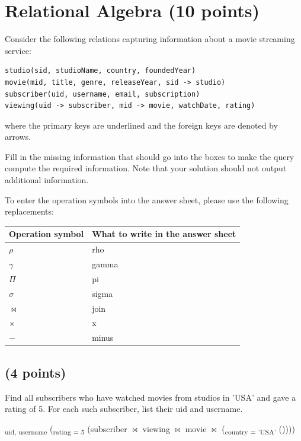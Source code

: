 \documentclass[11pt,a4paper]{article}
\begin{document}
\newpage

\section{Relational Algebra (10 points)}

Consider the following relations capturing information about a movie streaming service:

\begin{verbatim}
studio(sid, studioName, country, foundedYear)
movie(mid, title, genre, releaseYear, sid -> studio)
subscriber(uid, username, email, subscription)
viewing(uid -> subscriber, mid -> movie, watchDate, rating)
\end{verbatim}

where the primary keys are underlined and the foreign keys are denoted by arrows.

Fill in the missing information that should go into the boxes to make the query compute the required information. Note that your solution should not output additional information.

To enter the operation symbols into the answer sheet, please use the following replacements:

\begin{center}
\begin{tabular}{|l|l|}
\hline
\textbf{Operation symbol} & \textbf{What to write in the answer sheet} \\
\hline
$\rho$ & rho \\
$\gamma$ & gamma \\
$\Pi$ & pi \\
$\sigma$ & sigma \\
$\bowtie$ & join \\
$\times$ & x \\
$-$ & minus \\
\hline
\end{tabular}
\end{center}

\subsection{(4 points)}
Find all subscribers who have watched movies from studios in 'USA' and gave a rating of 5. For each such subscriber, list their uid and username.

\begin{center}
\textsubscript{uid, username} (\textsubscript{rating = 5} (subscriber $\bowtie$ viewing $\bowtie$ movie $\bowtie$ (\textsubscript{country = 'USA'} ())))
\end{center}
\end{document}

